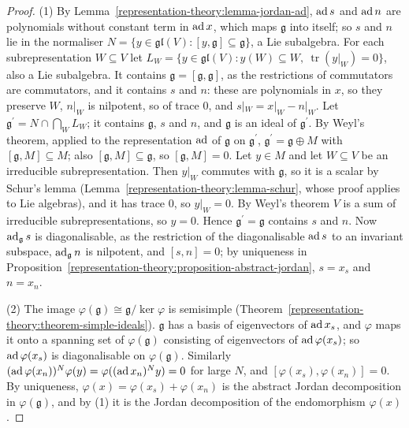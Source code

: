 \begin{proof}
(1) By Lemma~\ref{representation-theory:lemma-jordan-ad}, $\operatorname{ad} s$ and $\operatorname{ad} n$ are polynomials without constant term in $\operatorname{ad} x$, which maps $\mathfrak{g}$ into itself; so $s$ and
$n$ lie in the normaliser $N = \{y \in \mathfrak{gl}(V) : [y, \mathfrak{g}] \subseteq \mathfrak{g}\}$, a Lie subalgebra. For each subrepresentation $W \subseteq V$ let
$L_W = \{y \in \mathfrak{gl}(V) : y(W) \subseteq W,\ \operatorname{tr}(y|_W) = 0\}$, also a Lie subalgebra. It contains $\mathfrak{g} = [\mathfrak{g}, \mathfrak{g}]$, as the
restrictions of commutators are commutators, and it contains $s$ and $n$: these are polynomials in $x$, so they preserve $W$, $n|_W$ is nilpotent, so of trace $0$, and
$s|_W = x|_W - n|_W$. Let $\mathfrak{g}^{\prime} = N \cap \bigcap_WL_W$; it contains $\mathfrak{g}$, $s$ and $n$, and $\mathfrak{g}$ is an ideal of $\mathfrak{g}^{\prime}$. By Weyl's
theorem, applied to the representation $\operatorname{ad}$ of $\mathfrak{g}$ on $\mathfrak{g}^{\prime}$, $\mathfrak{g}^{\prime} = \mathfrak{g} \oplus M$ with $[\mathfrak{g}, M] \subseteq M$;
also $[\mathfrak{g}, M] \subseteq \mathfrak{g}$, so $[\mathfrak{g}, M] = 0$. Let $y \in M$ and let $W \subseteq V$ be an irreducible subrepresentation. Then $y|_W$ commutes with
$\mathfrak{g}$, so it is a scalar by Schur's lemma (Lemma~\ref{representation-theory:lemma-schur}, whose proof applies to Lie algebras), and it has trace $0$, so $y|_W = 0$. By
Weyl's theorem $V$ is a sum of irreducible subrepresentations, so $y = 0$. Hence $\mathfrak{g}^{\prime} = \mathfrak{g}$ contains $s$ and $n$. Now $\operatorname{ad}_{\mathfrak{g}}s$ is
diagonalisable, as the restriction of the diagonalisable $\operatorname{ad} s$ to an invariant subspace, $\operatorname{ad}_{\mathfrak{g}}n$ is nilpotent, and $[s, n] = 0$; by uniqueness in
Proposition~\ref{representation-theory:proposition-abstract-jordan}, $s = x_s$ and $n = x_n$.

(2) The image $\varphi(\mathfrak{g}) \cong \mathfrak{g}/\ker\varphi$ is semisimple (Theorem~\ref{representation-theory:theorem-simple-ideals}). $\mathfrak{g}$ has a basis of eigenvectors of
$\operatorname{ad} x_s$, and $\varphi$ maps it onto a spanning set of $\varphi(\mathfrak{g})$ consisting of eigenvectors of $\operatorname{ad}\varphi(x_s)$; so $\operatorname{ad}\varphi(x_s)$ is diagonalisable on
$\varphi(\mathfrak{g})$. Similarly $(\operatorname{ad}\varphi(x_n))^N\varphi(y) = \varphi((\operatorname{ad} x_n)^Ny) = 0$ for large $N$, and $[\varphi(x_s), \varphi(x_n)] = 0$. By uniqueness,
$\varphi(x) = \varphi(x_s) + \varphi(x_n)$ is the abstract Jordan decomposition in $\varphi(\mathfrak{g})$, and by (1) it is the Jordan decomposition of the endomorphism $\varphi(x)$.
\end{proof}

